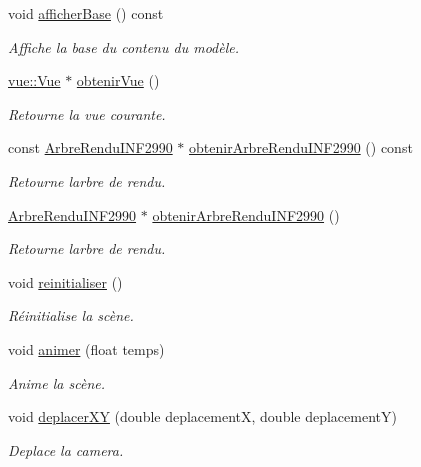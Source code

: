 \begin{DoxyCompactItemize}
void \hyperlink{group__inf2990_ga23bed5e3b226e446cfee30084150f7f7}{afficher\+Base} () const 
\begin{DoxyCompactList}\small\item\em Affiche la base du contenu du modèle. \end{DoxyCompactList}\item 
\hyperlink{classvue_1_1_vue}{vue\+::\+Vue} $\ast$ \hyperlink{group__inf2990_gaa56cf96b7e381e0f14e2c9a55be913bf}{obtenir\+Vue} ()
\begin{DoxyCompactList}\small\item\em Retourne la vue courante. \end{DoxyCompactList}\item 
const \hyperlink{class_arbre_rendu_i_n_f2990}{Arbre\+Rendu\+I\+N\+F2990} $\ast$ \hyperlink{group__inf2990_gaf578161d03b2157cdaa3182900ff61cc}{obtenir\+Arbre\+Rendu\+I\+N\+F2990} () const 
\begin{DoxyCompactList}\small\item\em Retourne l\textquotesingle{}arbre de rendu. \end{DoxyCompactList}\item 
\hyperlink{class_arbre_rendu_i_n_f2990}{Arbre\+Rendu\+I\+N\+F2990} $\ast$ \hyperlink{group__inf2990_ga12d5594db6a9507b24c7e1ffcd6751af}{obtenir\+Arbre\+Rendu\+I\+N\+F2990} ()
\begin{DoxyCompactList}\small\item\em Retourne l\textquotesingle{}arbre de rendu. \end{DoxyCompactList}\item 
void \hyperlink{group__inf2990_ga4c2a991fe2297e44eeee0de111fb08d2}{reinitialiser} ()
\begin{DoxyCompactList}\small\item\em Réinitialise la scène. \end{DoxyCompactList}\item 
void \hyperlink{group__inf2990_ga24dcb4e32cf104797158b398bafbfbb7}{animer} (float temps)
\begin{DoxyCompactList}\small\item\em Anime la scène. \end{DoxyCompactList}\item 
void \hyperlink{group__inf2990_ga1d0468d14d18990c39861b22d4921a7c}{deplacer\+X\+Y} (double deplacement\+X, double deplacement\+Y)
\begin{DoxyCompactList}\small\item\em Deplace la camera. \end{DoxyCompactList}\item 

\end{DoxyCompactItemize}

